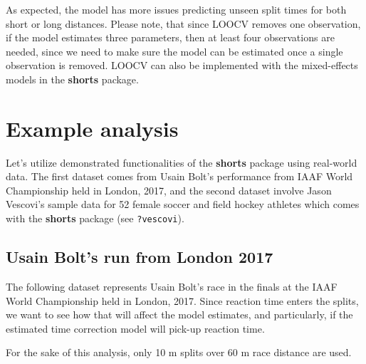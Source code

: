 \documentclass[fleqn,10pt]{wlpeerj} %
\begin{document}
As expected, the model has more issues predicting unseen split times for both short or long distances. Please note, that since LOOCV removes one observation, if the model estimates three parameters, then at least four observations are needed, since we need to make sure the model can be estimated once a single observation is removed. LOOCV can also be implemented with the mixed-effects models in the \textbf{shorts} package.

\hypertarget{example-analysis}{%
\section{Example analysis}\label{example-analysis}}

Let's utilize demonstrated functionalities of the \textbf{shorts} package using real-world data. The first dataset comes from Usain Bolt's performance from IAAF World Championship held in London, 2017, and the second dataset involve Jason Vescovi's sample data for 52 female soccer and field hockey athletes which comes with the \textbf{shorts} package (see \texttt{?vescovi}).

\hypertarget{usain-bolts-run-from-london-2017}{%
\subsection{Usain Bolt's run from London 2017}\label{usain-bolts-run-from-london-2017}}

The following dataset represents Usain Bolt's race in the finals at the IAAF World Championship held in London, 2017. Since reaction time enters the splits, we want to see how that will affect the model estimates, and particularly, if the estimated time correction model will pick-up reaction time.

For the sake of this analysis, only 10 m splits over 60 m race distance are used.

\small
\end{document}
